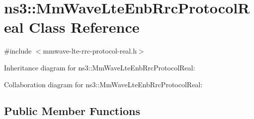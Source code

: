 \hypertarget{classns3_1_1MmWaveLteEnbRrcProtocolReal}{}\section{ns3\+:\+:Mm\+Wave\+Lte\+Enb\+Rrc\+Protocol\+Real Class Reference}
\label{classns3_1_1MmWaveLteEnbRrcProtocolReal}


{\ttfamily \#include $<$mmwave-\/lte-\/rrc-\/protocol-\/real.\+h$>$}



Inheritance diagram for ns3\+:\+:Mm\+Wave\+Lte\+Enb\+Rrc\+Protocol\+Real\+:


Collaboration diagram for ns3\+:\+:Mm\+Wave\+Lte\+Enb\+Rrc\+Protocol\+Real\+:
\subsection*{Public Member Functions}
